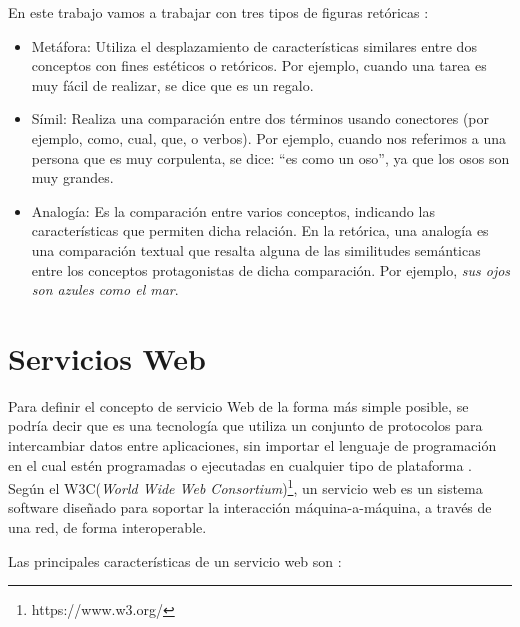 En este trabajo vamos a trabajar con tres tipos de figuras retóricas \citep{TFMPaloma2017}: 
\begin{itemize}
	\item Metáfora: Utiliza el desplazamiento de características similares entre dos conceptos con fines estéticos o retóricos. Por ejemplo, cuando una tarea es muy fácil de realizar, se dice que es un regalo.
	
	\item Símil: Realiza una comparación entre dos términos usando conectores (por ejemplo, como, cual, que, o verbos).
	Por ejemplo, cuando nos referimos a una persona que es muy corpulenta, se dice: ``es como un oso'', ya que los osos son muy grandes.
	
	\item Analogía: Es la comparación entre varios conceptos, indicando las características que permiten dicha relación. En la retórica, una analogía es una comparación textual que resalta alguna de las similitudes semánticas entre los conceptos protagonistas de dicha comparación. Por ejemplo, \textit{sus ojos son azules como el mar}.
	
	
	
\end{itemize}

\section{Servicios Web}
\label{cap:sec:serviciosweb}

Para definir el concepto de servicio Web de la forma más simple posible, se podría decir que es una tecnología que utiliza un conjunto de protocolos para intercambiar datos entre aplicaciones, sin importar el lenguaje de programación en el cual estén programadas o ejecutadas en cualquier tipo de plataforma \citep{wiki:w3c2004}. Según el W3C(\textit{World Wide Web Consortium})\footnote{https://www.w3.org/}, un servicio web es un sistema software diseñado para soportar la interacción máquina-a-máquina, a través de una red, de forma interoperable.




Las principales características de un servicio web son \citep{TorresJoaquin2017SC}:



